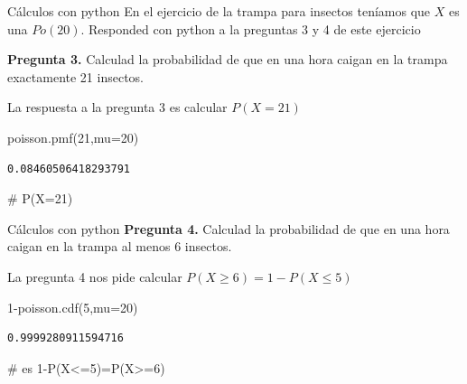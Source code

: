 \documentclass[
  ignorenonframetext,
  aspectratio=169]{beamer}
\newenvironment{Shaded}{\begin{snugshade}}{\end{snugshade}}
\newcommand{\CommentTok}[1]{\textcolor[rgb]{0.37,0.37,0.37}{#1}}
\newcommand{\DecValTok}[1]{\textcolor[rgb]{0.68,0.00,0.00}{#1}}
\newcommand{\NormalTok}[1]{\textcolor[rgb]{0.00,0.23,0.31}{#1}}
\newcommand{\OperatorTok}[1]{\textcolor[rgb]{0.37,0.37,0.37}{#1}}
\begin{document}
\begin{frame}[fragile]{Cálculos con python}
\protect\hypertarget{cuxe1lculos-con-python-7}{}
En el ejercicio de la trampa para insectos teníamos que \(X\) es una
\(Po(20)\). Responded con python a la preguntas 3 y 4 de este ejercicio

\textbf{Pregunta 3.} Calculad la probabilidad de que en una hora caigan
en la trampa exactamente 21 insectos.

La respuesta a la pregunta 3 es calcular \(P(X=21)\)

\begin{Shaded}
\begin{Highlighting}[]
\NormalTok{poisson.pmf(}\DecValTok{21}\NormalTok{,mu}\OperatorTok{=}\DecValTok{20}\NormalTok{)}
\end{Highlighting}
\end{Shaded}

\begin{verbatim}
0.08460506418293791
\end{verbatim}

\begin{Shaded}
\begin{Highlighting}[]
\CommentTok{\# P(X=21)}
\end{Highlighting}
\end{Shaded}
\end{frame}

\begin{frame}[fragile]{Cálculos con python}
\protect\hypertarget{cuxe1lculos-con-python-8}{}
\textbf{Pregunta 4.} Calculad la probabilidad de que en una hora caigan
en la trampa al menos 6 insectos.

La pregunta 4 nos pide calcular \(P(X\geq 6)=1-P(X\leq 5)\)

\begin{Shaded}
\begin{Highlighting}[]
\DecValTok{1}\OperatorTok{{-}}\NormalTok{poisson.cdf(}\DecValTok{5}\NormalTok{,mu}\OperatorTok{=}\DecValTok{20}\NormalTok{) }
\end{Highlighting}
\end{Shaded}

\begin{verbatim}
0.9999280911594716
\end{verbatim}

\begin{Shaded}
\begin{Highlighting}[]
\CommentTok{\# es 1{-}P(X\textless{}=5)=P(X\textgreater{}=6)}
\end{Highlighting}
\end{Shaded}
\end{frame}
\end{document}
